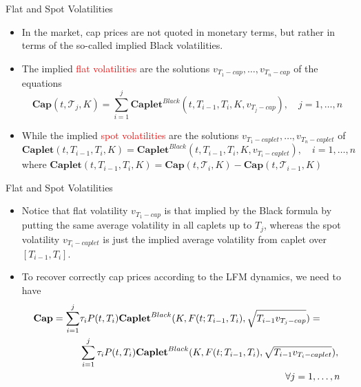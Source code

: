 \documentclass{beamer}
\begin{document}
\begin{frame}{Flat and Spot Volatilities}
	\begin{itemize}
		\item<1-> In the market, cap prices are not quoted in monetary terms, but rather in terms of the so-called implied Black volatilities. 
		\item<2-> The implied \textcolor{red}{flat volatilities} are the solutions $v_{T_1-cap},\ldots, v_{T_n-cap}$ of the equations
		\begin{equation*}
			\textbf{Cap}(t, \mathcal{T}_j, K) = \sum_{i=1}^j \textbf{Caplet}^{Black}(t, T_{i-1}, T_i,K,v_{T_j-cap}),\quad j=1, \ldots,n
		\end{equation*}
		\item<3-> While the implied \textcolor{red}{spot volatilities} are the solutions $v_{T_1-caplet},\ldots, v_{T_n-caplet}$ of
		\begin{equation*}
			\textbf{Caplet}(t, T_{i-1},T_i,K) = \textbf{Caplet}^{Black}(t, T_{i-1}, T_i,K,v_{T_i-caplet}),\quad i=1, \ldots,n
		\end{equation*} 
		where $\textbf{Caplet}(t, T_{i-1}, T_i, K) = \textbf{Cap}(t, \mathcal{T}_i,K)-\textbf{Cap}(t, \mathcal{T}_{i-1},K)$
	\end{itemize}
\end{frame}

\begin{frame}{Flat and Spot Volatilities}
	\begin{itemize}
		\item<1-> Notice that flat volatility $v_{T_1-cap}$ is that implied by the Black formula by putting the same average volatility in all caplets up to $T_j$, whereas the spot volatility $v_{T_i-caplet}$ is just the implied average volatility from caplet over $[T_{i-1}, T_i]$.
		\item<2-> To recover correctly cap prices according to the LFM dynamics, we need to have
		\begin{equation*}
			\begin{aligned}
				\textbf{Cap} = \sum_{i=1}^j&\tau_iP(t,T_i)\textbf{Caplet}^{Black}(K,F(t;T_{i-1},T_i),\sqrt{T_{i-1}v_{T_j-cap}}) = \\ &\sum_{i=1}^j\tau_iP(t,T_i)\textbf{Caplet}^{Black}(K,F(t;T_{i-1},T_i),\sqrt{T_{i-1}v_{T_i-caplet}}),\\
				&\hspace{75mm}\forall j = 1,\dots, n
			\end{aligned}
		\end{equation*}
	\end{itemize}
\end{frame}	
\end{document}
